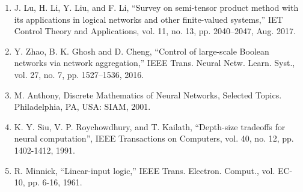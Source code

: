 \documentclass{article}
\begin{document}
\begin{enumerate}
	\item J. Lu, H. Li, Y. Liu, and F. Li, “Survey on semi-tensor product method with its applications
	in logical networks and other finite-valued systems,” IET Control Theory and Applications, vol.
	11, no. 13, pp. 2040–2047, Aug. 2017.

	\item Y. Zhao, B. K. Ghosh and D. Cheng, “Control of large-scale Boolean networks via network
	aggregation,” IEEE Trans. Neural Netw. Learn. Syst., vol. 27, no. 7, pp. 1527–1536, 2016.

	\item M. Anthony, Discrete Mathematics of Neural Networks, Selected Topics. Philadelphia, PA,
	USA: SIAM, 2001.

	\item K. Y. Siu, V. P. Roychowdhury, and T. Kailath, “Depth-size tradeoffs for neural computation”,
	IEEE Transactions on Computers, vol. 40, no. 12, pp. 1402-1412, 1991.

	\item R. Minnick, “Linear-input logic,” IEEE Trans. Electron. Comput., vol. EC-10, pp. 6-16, 1961.
\end{enumerate}
\end{document}
